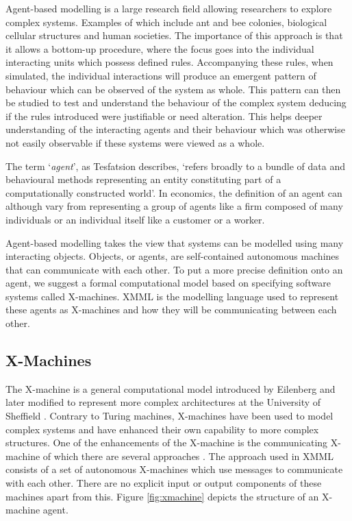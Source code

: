 \documentclass[a4paper,11pt]{article}
\begin{document}
Agent-based modelling is a large research field allowing researchers
to explore complex systems. Examples of which include ant and bee
colonies, biological cellular structures and human societies. The
importance of this approach is that it allows a bottom-up procedure,
where the focus goes into the individual interacting units which
possess defined rules. Accompanying these rules, when simulated, the
individual interactions will produce an emergent pattern of
behaviour which can be observed of the system as whole. This pattern
can then be studied to test and understand the behaviour of the
complex system deducing if the rules introduced were justifiable or
need alteration. This helps deeper understanding of the interacting
agents and their behaviour which was otherwise not easily observable
if these systems were viewed as a whole.

The term `\emph{agent}', as Tesfatsion \cite{TESFATSION:website}
describes, `refers broadly to a bundle of data and behavioural
methods representing an entity constituting part of a
computationally constructed world'. In economics, the definition of
an agent can although vary from representing a group of agents like
a firm composed of many individuals or an individual itself like a
customer or a worker.

Agent-based modelling takes the view that systems can be modelled
using many interacting objects. Objects, or agents, are
self-contained autonomous machines that can communicate with each
other. To put a more precise definition onto an agent, we suggest a
formal computational model based on specifying software systems called X-machines.
XMML is the modelling language used to represent these
agents as X-machines and how they will be communicating between each other.

\subsection{X-Machines}
\label{xmachine}

The X-machine is a general computational model introduced by
Eilenberg \cite{EILENBERG:xmachines} and later modified to represent
more complex architectures at the University of Sheffield
\cite{HOLCOMBE:1986}. Contrary to Turing machines, X-machines have
been used to model complex systems and have enhanced their own
capability to more complex structures. One of the enhancements of
the X-machine is the communicating X-machine of which there are
several approaches \cite{BALANESCU:1999,BARNARD:1996}. The approach used in XMML consists of a set of
autonomous X-machines which use messages to communicate with each
other. There are no explicit input or output components of these
machines apart from this. Figure \ref{fig:xmachine} depicts the
structure of an X-machine agent.
\end{document}
